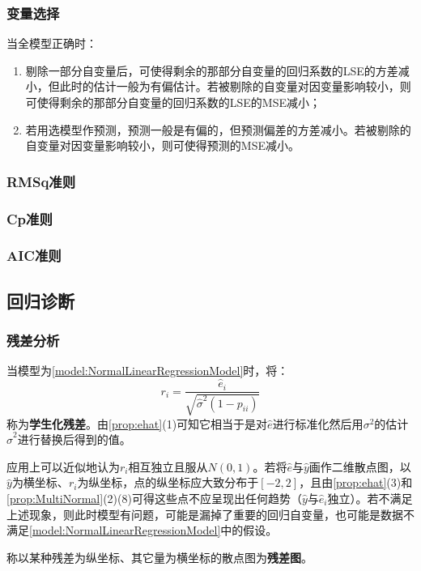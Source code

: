 \subsubsection{变量选择}
\begin{theorem}
	当全模型正确时：
	\begin{enumerate}
		\item 剔除一部分自变量后，可使得剩余的那部分自变量的回归系数的LSE的方差减小，但此时的估计一般为有偏估计。若被剔除的自变量对因变量影响较小，则可使得剩余的那部分自变量的回归系数的LSE的MSE减小；
		\item 若用选模型作预测，预测一般是有偏的，但预测偏差的方差减小。若被剔除的自变量对因变量影响较小，则可使得预测的MSE减小。
	\end{enumerate}
\end{theorem}
\subsubsection{RMSq准则}
\subsubsection{Cp准则}
\subsubsection{AIC准则}

\subsection{回归诊断}
\subsubsection{残差分析}
\begin{definition}
	当模型为\cref{model:NormalLinearRegressionModel}时，将：
	\begin{equation*}
		r_i=\frac{\hat{e}_i}{\sqrt{\hat{\sigma}^2(1-p_{ii})}}
	\end{equation*}
	称为\textbf{学生化残差}。由\cref{prop:ehat}(1)可知它相当于是对$\hat{e}$进行标准化然后用$\sigma^2$的估计$\hat{\sigma}^2$进行替换后得到的值。
\end{definition}
\begin{note}
	应用上可以近似地认为$r_i$相互独立且服从$N(0,1)$。若将$\hat{e}$与$\hat{y}$画作二维散点图，以$\hat{y}$为横坐标、$r_i$为纵坐标，点的纵坐标应大致分布于$[-2,2]$，且由\cref{prop:ehat}(3)和\cref{prop:MultiNormal}(2)(8)可得这些点不应呈现出任何趋势（$\hat{y}$与$\hat{e}_i$独立）。若不满足上述现象，则此时模型有问题，可能是漏掉了重要的回归自变量，也可能是数据不满足\cref{model:NormalLinearRegressionModel}中的假设。
\end{note}
\begin{definition}
	称以某种残差为纵坐标、其它量为横坐标的散点图为\textbf{残差图}。
\end{definition}
